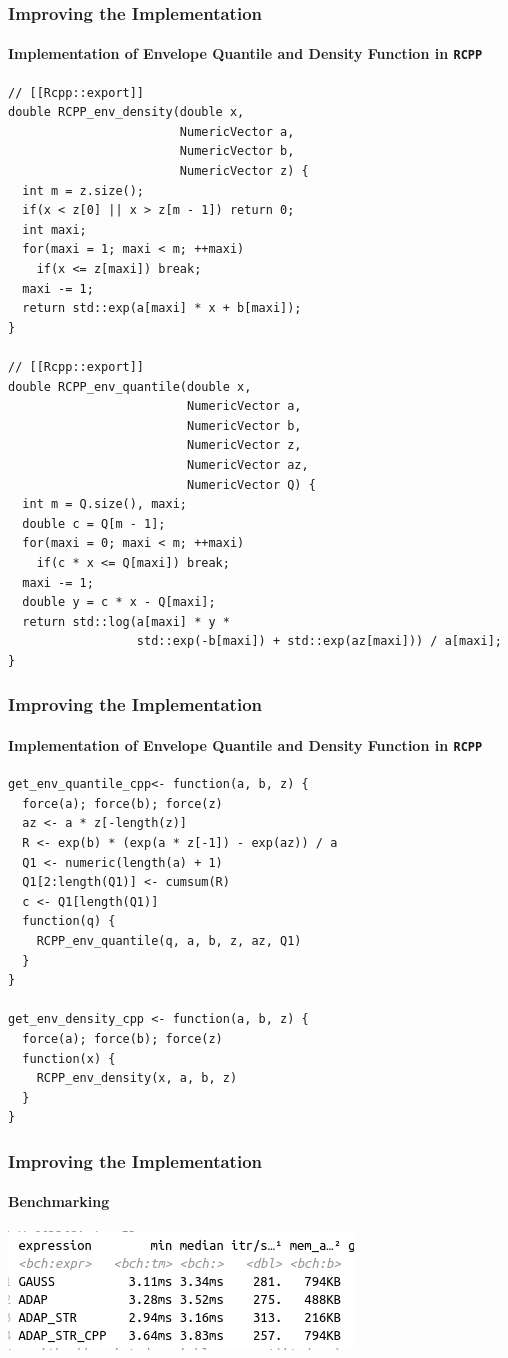 \documentclass[aspectratio=169]{beamer}
\begin{document}
\begin{frame}[fragile]
  \frametitle{Improving the Implementation}
  \framesubtitle{Implementation of Envelope Quantile and Density Function in \texttt{RCPP}}  
\begin{verbatim}
// [[Rcpp::export]]
double RCPP_env_density(double x, 
                        NumericVector a, 
                        NumericVector b, 
                        NumericVector z) {
  int m = z.size();
  if(x < z[0] || x > z[m - 1]) return 0;
  int maxi;
  for(maxi = 1; maxi < m; ++maxi)
    if(x <= z[maxi]) break;
  maxi -= 1;
  return std::exp(a[maxi] * x + b[maxi]);
}

// [[Rcpp::export]]
double RCPP_env_quantile(double x, 
                         NumericVector a, 
                         NumericVector b, 
                         NumericVector z,
                         NumericVector az,
                         NumericVector Q) {
  int m = Q.size(), maxi;
  double c = Q[m - 1];
  for(maxi = 0; maxi < m; ++maxi)
    if(c * x <= Q[maxi]) break;
  maxi -= 1;
  double y = c * x - Q[maxi];
  return std::log(a[maxi] * y * 
                  std::exp(-b[maxi]) + std::exp(az[maxi])) / a[maxi];
}
\end{verbatim}
\end{frame}
\begin{frame}[fragile]
  \frametitle{Improving the Implementation}
  \framesubtitle{Implementation of Envelope Quantile and Density Function in \texttt{RCPP}}
\begin{verbatim}
get_env_quantile_cpp<- function(a, b, z) {
  force(a); force(b); force(z)
  az <- a * z[-length(z)]
  R <- exp(b) * (exp(a * z[-1]) - exp(az)) / a
  Q1 <- numeric(length(a) + 1)
  Q1[2:length(Q1)] <- cumsum(R)
  c <- Q1[length(Q1)]
  function(q) {
    RCPP_env_quantile(q, a, b, z, az, Q1)
  }
}

get_env_density_cpp <- function(a, b, z) {
  force(a); force(b); force(z)
  function(x) {
    RCPP_env_density(x, a, b, z)
  }
}
\end{verbatim}
\end{frame}
\begin{frame}
  \frametitle{Improving the Implementation}
  \framesubtitle{Benchmarking}
  \centering
  \includegraphics[scale = 0.6]{figure/RCPP_TABLE.png}
\end{frame}
\end{document}
